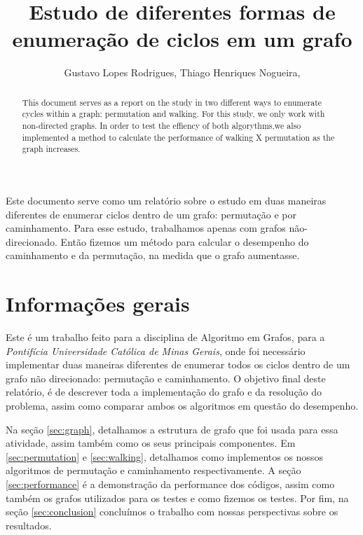 \documentclass[12pt]{article}
\title{Estudo de diferentes formas de enumeração de ciclos em um grafo}
\author{Gustavo Lopes Rodrigues\inst{1}, Thiago Henriques Nogueira\inst{2},}
\begin{document}
 

  \maketitle

  \begin{abstract} 
    This document serves as a report on the study in two different ways
    to enumerate cycles within a graph: permutation and walking. For this
    study, we only work with non-directed graphs. In order to test the effiency 
    of both algorythms,we also implemented a method to calculate the performance of walking
    X permutation as the graph increases.
  \end{abstract}

  \begin{resumo} 
    Este documento serve como um relatório sobre o estudo em duas maneiras 
    diferentes de enumerar ciclos dentro de um grafo: permutação e por caminhamento. Para esse 
    estudo, trabalhamos apenas com grafos não-direcionado. Então fizemos um método
    para calcular o desempenho do caminhamento e da permutação, na medida que o grafo aumentasse.
  \end{resumo}


  \section{Informações gerais}

    Este é um trabalho feito para a disciplina de Algoritmo em Grafos, para a 
    \emph{Pontifícia Universidade Católica de Minas Gerais}, onde foi necessário 
    implementar duas maneiras diferentes de enumerar todos os ciclos dentro de um 
    grafo não direcionado: permutação e caminhamento. O objetivo final  deste relatório, 
    é de descrever toda a implementação do grafo e da resolução do problema, assim como 
    comparar ambos os algoritmos em questão do desempenho.

    Na seção \ref{sec:graph}, detalhamos a estrutura de grafo que foi usada para essa atividade,
    assim também como os seus principais componentes. Em \ref{sec:permutation} e \ref{sec:walking},
    detalhamos como implementos os nossos algoritmos de permutação e caminhamento respectivamente.
    A seção \ref{sec:performance} é a demonstração da performance dos códigos, assim como também 
    os grafos utilizados para os testes e como fizemos os testes. Por fim, na seção \ref{sec:conclusion}
    concluímos o trabalho com nossas perspectivas sobre os resultados.
\end{document}
